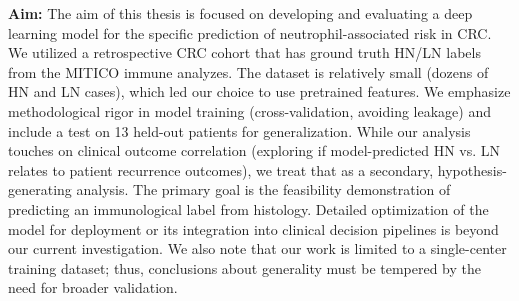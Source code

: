 \textbf{Aim:} The aim of this thesis is focused on developing and evaluating a deep learning model for the specific prediction of neutrophil-associated risk in CRC. We utilized a retrospective CRC cohort that has ground truth HN/LN labels from the MITICO immune analyzes. The dataset is relatively small (dozens of HN and LN cases), which led our choice to use pretrained features. We emphasize methodological rigor in model training (cross-validation, avoiding leakage) and include a test on 13 held-out patients for generalization. While our analysis touches on clinical outcome correlation (exploring if model-predicted HN vs. LN relates to patient recurrence outcomes), we treat that as a secondary, hypothesis-generating analysis. The primary goal is the feasibility demonstration of predicting an immunological label from histology. Detailed optimization of the model for deployment or its integration into clinical decision pipelines is beyond our current investigation.
We also note that our work is limited to a single-center training dataset; thus, conclusions about generality must be tempered by the need for broader validation.


